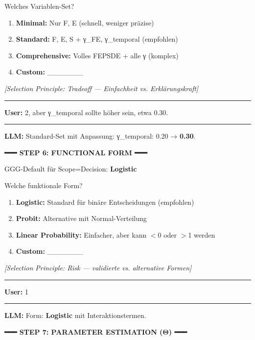 \begin{tcolorbox}[colback=blue!5!white, colframe=blue!75!black,
    title=Example: GEFÜHRT Model Design (All 10 Steps), breakable]
Welches Variablen-Set?
\begin{enumerate}
\item \textbf{Minimal:} Nur F, E (schnell, weniger präzise)
\item \textbf{Standard:} F, E, S + γ\_FE, γ\_temporal (empfohlen)
\item \textbf{Comprehensive:} Volles FEPSDE + alle γ (komplex)
\item \textbf{Custom:} \_\_\_\_\_\_\_
\end{enumerate}

\textit{[Selection Principle: Tradeoff --- Einfachheit vs. Erklärungskraft]}

\hrule
\vspace{0.3em}

\textbf{User:} 2, aber γ\_temporal sollte höher sein, etwa 0.30.

\hrule
\vspace{0.3em}

\textbf{LLM:} Standard-Set mit Anpassung: γ\_temporal: 0.20 → \textbf{0.30}.

\vspace{0.3em}
\textbf{━━━ STEP 6: FUNCTIONAL FORM ━━━}
\vspace{0.3em}

GGG-Default für Scope=Decision: \textbf{Logistic}

Welche funktionale Form?
\begin{enumerate}
\item \textbf{Logistic:} Standard für binäre Entscheidungen (empfohlen)
\item \textbf{Probit:} Alternative mit Normal-Verteilung
\item \textbf{Linear Probability:} Einfacher, aber kann $<$0 oder $>$1 werden
\item \textbf{Custom:} \_\_\_\_\_\_\_
\end{enumerate}

\textit{[Selection Principle: Risk --- validierte vs. alternative Formen]}

\hrule
\vspace{0.3em}

\textbf{User:} 1

\hrule
\vspace{0.3em}

\textbf{LLM:} Form: \textbf{Logistic} mit Interaktionstermen.

\vspace{0.3em}
\textbf{━━━ STEP 7: PARAMETER ESTIMATION (Θ) ━━━}
\vspace{0.3em}


\end{tcolorbox}
